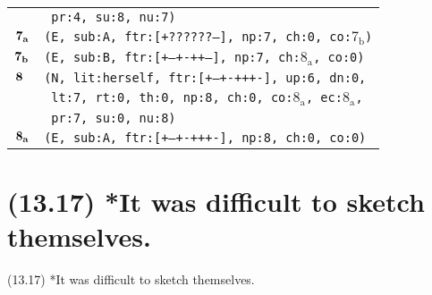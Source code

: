 \documentclass{article}
\begin{document}
\begin{minipage}{\textwidth}
{\begin{tabular}{|r|l|}
    & \texttt{\texttt{~pr:4,~su:8,~nu:7)}} \\
    ${\textbf{\textrm{7}}_{\textbf{\textrm{a}}}}$ & \texttt{\texttt{(E,~sub:A,~ftr:[+??????--],~np:7,~ch:0,~co:${\textrm{7}_{\textrm{b}}}$)}} \\
    ${\textbf{\textrm{7}}_{\textbf{\textrm{b}}}}$ & \texttt{\texttt{(E,~sub:B,~ftr:[+--+-++--],~np:7,~ch:${\textrm{8}_{\textrm{a}}}$,~co:0)}} \\
    ${\textbf{\textrm{8}}_{\phantom{z}}}$ & \texttt{\texttt{(N,~lit:herself,~ftr:[+--+-+++-],~up:6,~dn:0,}} \\
    & \texttt{\texttt{~lt:7,~rt:0,~th:0,~np:8,~ch:0,~co:${\textrm{8}_{\textrm{a}}}$,~ec:${\textrm{8}_{\textrm{a}}}$,}} \\
    & \texttt{\texttt{~pr:7,~su:0,~nu:8)}} \\
    ${\textbf{\textrm{8}}_{\textbf{\textrm{a}}}}$ & \texttt{\texttt{(E,~sub:A,~ftr:[+--+-+++-],~np:8,~ch:0,~co:0)}} \\
    \hline
  \end{tabular}
  }
\end{minipage}
\bigbreak

\clearpage

%
%

\section*{(13.17) *It was difficult to sketch themselves.}

\bigbreak
\begin{enumerate*}
\item[(13.17)] *It was difficult to sketch themselves.
\end{enumerate*}
\bigbreak
\end{document}
